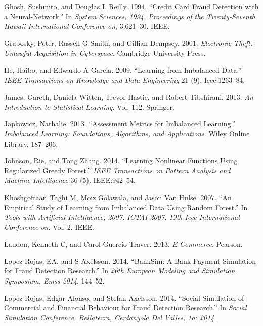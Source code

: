 \documentclass[12pt,]{article}
\begin{document}
\leavevmode\hypertarget{ref-ghosh1994credit}{}%
Ghosh, Sushmito, and Douglas L Reilly. 1994. ``Credit Card Fraud
Detection with a Neural-Network.'' In \emph{System Sciences, 1994.
Proceedings of the Twenty-Seventh Hawaii International Conference on},
3:621--30. IEEE.

\leavevmode\hypertarget{ref-grabosky2001electronic}{}%
Grabosky, Peter, Russell G Smith, and Gillian Dempsey. 2001.
\emph{Electronic Theft: Unlawful Acquisition in Cyberspace}. Cambridge
University Press.

\leavevmode\hypertarget{ref-he2009learning}{}%
He, Haibo, and Edwardo A Garcia. 2009. ``Learning from Imbalanced
Data.'' \emph{IEEE Transactions on Knowledge and Data Engineering} 21
(9). Ieee:1263--84.

\leavevmode\hypertarget{ref-james2013introduction}{}%
James, Gareth, Daniela Witten, Trevor Hastie, and Robert Tibshirani.
2013. \emph{An Introduction to Statistical Learning}. Vol. 112.
Springer.

\leavevmode\hypertarget{ref-japkowicz2013assessment}{}%
Japkowicz, Nathalie. 2013. ``Assessment Metrics for Imbalanced
Learning.'' \emph{Imbalanced Learning: Foundations, Algorithms, and
Applications}. Wiley Online Library, 187--206.

\leavevmode\hypertarget{ref-johnson2014learning}{}%
Johnson, Rie, and Tong Zhang. 2014. ``Learning Nonlinear Functions Using
Regularized Greedy Forest.'' \emph{IEEE Transactions on Pattern Analysis
and Machine Intelligence} 36 (5). IEEE:942--54.

\leavevmode\hypertarget{ref-khoshgoftaar2007empirical}{}%
Khoshgoftaar, Taghi M, Moiz Golawala, and Jason Van Hulse. 2007. ``An
Empirical Study of Learning from Imbalanced Data Using Random Forest.''
In \emph{Tools with Artificial Intelligence, 2007. ICTAI 2007. 19th Ieee
International Conference on}. Vol. 2. IEEE.

\leavevmode\hypertarget{ref-laudon2013commerce}{}%
Laudon, Kenneth C, and Carol Guercio Traver. 2013. \emph{E-Commerce}.
Pearson.

\leavevmode\hypertarget{ref-lopez2014banksim}{}%
Lopez-Rojas, EA, and S Axelsson. 2014. ``BankSim: A Bank Payment
Simulation for Fraud Detection Research.'' In \emph{26th European
Modeling and Simulation Symposium, Emss 2014}, 144--52.

\leavevmode\hypertarget{ref-lopez2014social}{}%
Lopez-Rojas, Edgar Alonso, and Stefan Axelsson. 2014. ``Social
Simulation of Commercial and Financial Behaviour for Fraud Detection
Research.'' In \emph{Social Simulation Conference. Bellaterra,
Cerdanyola Del Valles, 1a: 2014}.
\end{document}
